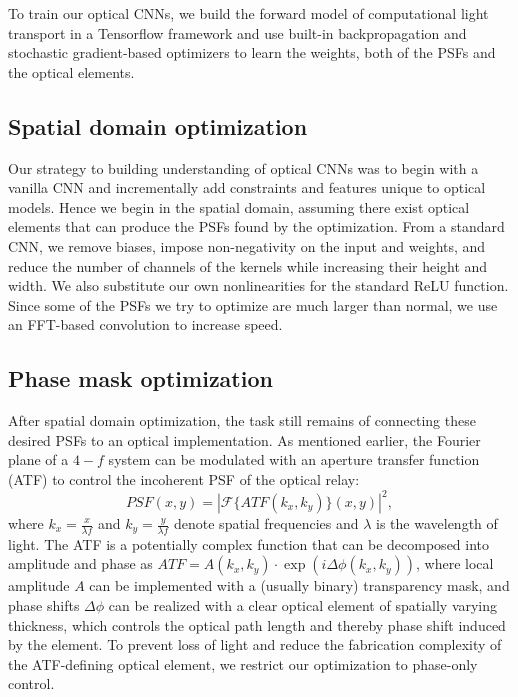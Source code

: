
To train our optical CNNs, we build the forward model of computational light transport in a Tensorflow framework and use built-in backpropagation and stochastic gradient-based optimizers to learn the weights, both of the PSFs and the optical elements.

\subsection*{Spatial domain optimization}
Our strategy to building understanding of optical CNNs was to begin with a vanilla CNN and incrementally add constraints and features unique to optical models. Hence we begin in the spatial domain, assuming there exist optical elements that can produce the PSFs found by the optimization. From a standard CNN, we remove biases, impose non-negativity on the input and weights, and reduce the number of channels of the kernels while increasing their height and width. We also substitute our own nonlinearities for the standard ReLU function. Since some of the PSFs we try to optimize are much larger than normal, we use an FFT-based convolution to increase speed. 

\subsection*{Phase mask optimization}
After spatial domain optimization, the task still remains of connecting these desired PSFs to an optical implementation. As mentioned earlier, the Fourier plane of a $4-f$ system can be modulated with an aperture transfer function (ATF) to control the incoherent PSF of the optical relay:
\begin{equation} PSF(x,y) = |\mathcal{F}\{ATF(k_x, k_y)\}(x,y)|^2,\end{equation}
where $ k_x = \frac{x}{\lambda f}$ and $k_y = \frac{y}{\lambda f}$ denote spatial frequencies and $\lambda$ is the wavelength of light. 
The ATF is a potentially complex function that can be decomposed into amplitude and phase as $ATF = A(k_x, k_y)\cdot \exp(i \Delta \phi (k_x, k_y))$, where local amplitude $A$ can be implemented with a (usually binary) transparency mask, and phase shifts $\Delta \phi$ can be realized with a clear optical element of spatially varying thickness, which controls the optical path length and thereby phase shift induced by the element. To prevent loss of light and reduce the fabrication complexity of the ATF-defining optical element, we restrict our optimization to phase-only control. 

